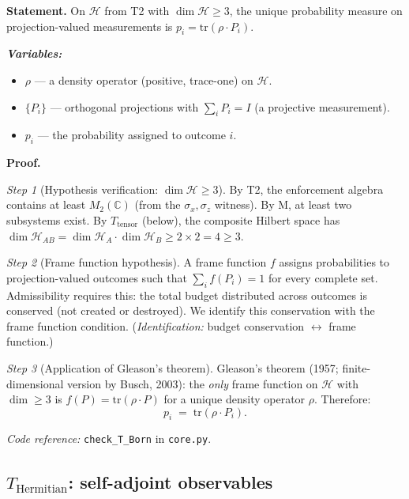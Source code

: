 \documentclass[11pt]{article}
\newenvironment{varlist}{\begin{itemize}[nosep,leftmargin=2em]}{\end{itemize}}
\newcommand{\coderef}[2]{\smallskip\noindent\textit{Code reference:} \texttt{#1} in \texttt{#2}.}
\begin{document}
\begin{tcolorbox}[apfbox, title={$T_{\mathrm{Born}}$: Born Rule from Admissibility Invariance}]
\textbf{Statement.}  On $\mathcal{H}$ from T2 with $\dim \mathcal{H} \ge 3$, the unique probability measure on projection-valued measurements is $p_i = \mathrm{tr}(\rho \cdot P_i)$.

\smallskip\noindent\textbf{\textit{Variables:}}
\begin{varlist}
\item $\rho$ --- a density operator (positive, trace-one) on $\mathcal{H}$.
\item $\{P_i\}$ --- orthogonal projections with $\sum_i P_i = I$ (a projective measurement).
\item $p_i$ --- the probability assigned to outcome $i$.
\end{varlist}

\smallskip\noindent\textbf{Proof.}

\textit{Step 1} (Hypothesis verification: $\dim \mathcal{H} \ge 3$).  By T2, the enforcement algebra contains at least $M_2(\mathbb{C})$ (from the $\sigma_x, \sigma_z$ witness).  By M, at least two subsystems exist.  By $T_{\mathrm{tensor}}$ (below), the composite Hilbert space has $\dim \mathcal{H}_{AB} = \dim \mathcal{H}_A \cdot \dim \mathcal{H}_B \ge 2 \times 2 = 4 \ge 3$.

\textit{Step 2} (Frame function hypothesis).  A frame function $f$ assigns probabilities to projection-valued outcomes such that $\sum_i f(P_i) = 1$ for every complete set.  Admissibility requires this: the total budget distributed across outcomes is conserved (not created or destroyed).  We identify this conservation with the frame function condition.  (\textit{Identification:} budget conservation $\leftrightarrow$ frame function.)

\textit{Step 3} (Application of Gleason's theorem).  Gleason's theorem (1957; finite-dimensional version by Busch, 2003): the \emph{only} frame function on $\mathcal{H}$ with $\dim \ge 3$ is $f(P) = \mathrm{tr}(\rho \cdot P)$ for a unique density operator $\rho$.  Therefore:
\begin{equation}
p_i \;=\; \mathrm{tr}(\rho \cdot P_i).
\end{equation}

\coderef{check\_T\_Born}{core.py}
\end{tcolorbox}


\subsection{\texorpdfstring{$T_{\mathrm{Hermitian}}$}{T Hermitian}: self-adjoint observables}
\end{document}
